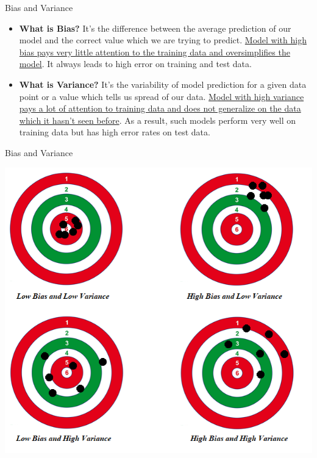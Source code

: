 \documentclass[11pt]{beamer}
\begin{document}
\begin{frame}{Bias and Variance}

\begin{itemize}

\item \textbf{What is Bias?} It's the difference between the average prediction of our model and the correct value which we are trying to predict. \ul{Model with high bias pays very little attention to the training data and oversimplifies the model}. It always leads to high error on training and test data.

\item \textbf{What is Variance?} It's the variability of model prediction for a given data point or a value which tells us spread of our data. \ul{Model with high variance pays a lot of attention to training data and does not generalize on the data which it hasn't seen before}. As a result, such models perform very well on training data but has high error rates on test data.

\end{itemize}

\end{frame}
%
%
\begin{frame}{Bias and Variance}
\begin{center}
\includegraphics[scale=.45]{../05-pictures/lesson-2-1_pic_14.png}  
\end{center}
\end{frame}
\end{document}
